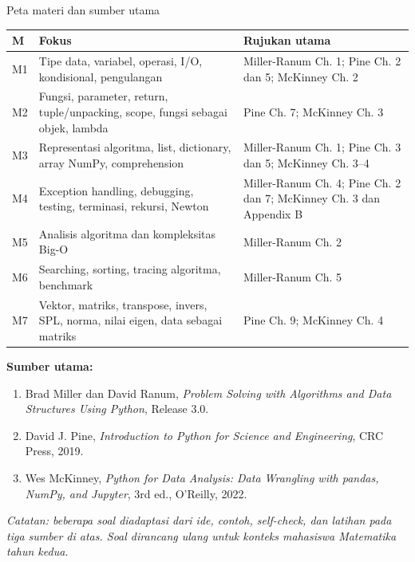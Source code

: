 \documentclass[9pt,a4paper]{article}
\begin{document}
\begin{conceptbox}{Peta materi dan sumber utama}
\renewcommand{\arraystretch}{1.13}
\begin{tabularx}{\linewidth}{@{}p{.09\linewidth}X p{.31\linewidth}@{}}
\toprule
\textbf{M} & \textbf{Fokus} & \textbf{Rujukan utama}\\
\midrule
M1 & Tipe data, variabel, operasi, I/O, kondisional, pengulangan & Miller-Ranum Ch. 1; Pine Ch. 2 dan 5; McKinney Ch. 2\\
M2 & Fungsi, parameter, return, tuple/unpacking, scope, fungsi sebagai objek, lambda & Pine Ch. 7; McKinney Ch. 3\\
M3 & Representasi algoritma, list, dictionary, array NumPy, comprehension & Miller-Ranum Ch. 1; Pine Ch. 3 dan 5; McKinney Ch. 3--4\\
M4 & Exception handling, debugging, testing, terminasi, rekursi, Newton & Miller-Ranum Ch. 4; Pine Ch. 2 dan 7; McKinney Ch. 3 dan Appendix B\\
M5 & Analisis algoritma dan kompleksitas Big-O & Miller-Ranum Ch. 2\\
M6 & Searching, sorting, tracing algoritma, benchmark & Miller-Ranum Ch. 5\\
M7 & Vektor, matriks, transpose, invers, SPL, norma, nilai eigen, data sebagai matriks & Pine Ch. 9; McKinney Ch. 4\\
\bottomrule
\end{tabularx}
\end{conceptbox}

{\small\textbf{Sumber utama:}}
\begin{enumerate}
\item Brad Miller dan David Ranum, \textit{Problem Solving with Algorithms and Data Structures Using Python}, Release 3.0.
\item David J. Pine, \textit{Introduction to Python for Science and Engineering}, CRC Press, 2019.
\item Wes McKinney, \textit{Python for Data Analysis: Data Wrangling with pandas, NumPy, and Jupyter}, 3rd ed., O'Reilly, 2022.
\end{enumerate}

\vspace{1mm}
\begin{center}
\small\color{darkgray}\textit{Catatan: beberapa soal diadaptasi dari ide, contoh, self-check, dan latihan pada tiga sumber di atas. Soal dirancang ulang untuk konteks mahasiswa Matematika tahun kedua.}
\end{center}
\end{document}
